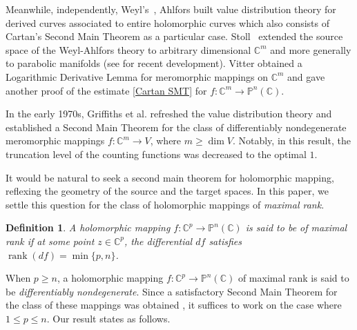 \documentclass[english, 12pt]{amsart}
\DeclareMathOperator{\rank}{rank}
\theoremstyle{plain}
\newtheorem{defi}[thm]{Definition}
\theoremstyle{remark}
\numberwithin{equation}{section}
\theoremstyle{plain}
\theoremstyle{named}
\begin{document}
	
	Meanwhile, independently, Weyl's~\cite{Weyl1938,Weyl1943}, Ahlfors \cite{Ahlfors1941} built value distribution theory for derived curves associated to entire holomorphic curves which also consists of Cartan's Second Main Theorem as a particular case. Stoll~\cite{Stoll53,Stoll54} extended the source space of the Weyl-Ahlfors theory to arbitrary dimensional $\mathbb{C}^m$ and more generally to parabolic manifolds (see \cite{HX2022} for recent development). Vitter \cite{Vitter77} obtained a Logarithmic Derivative Lemma for meromorphic mappings on $\mathbb{C}^m$ and  gave another proof of the estimate \eqref{Cartan SMT} for $f\colon\mathbb{C}^m\rightarrow\mathbb{P}^n(\mathbb{C})$.
	
In the early 1970s, Griffiths et al. \cite{Carlson-Griffiths 72, Griffiths-King73} refreshed the value distribution theory and established a  Second Main Theorem for the class of differentiably nondegenerate meromorphic mappings $f\colon \mathbb{C}^m\rightarrow V$, where $m\geq\dim V$. Notably, in this result, the truncation level of the counting functions  was decreased to the optimal $1$.
	
It  would be natural to seek a second main theorem for holomorphic mapping, reflexing the geometry of the source and the target spaces. In this paper, we settle this question for the class of holomorphic mappings of {\sl maximal rank}.
\begin{defi}
A holomorphic mapping $f\colon\mathbb{C}^p\rightarrow\mathbb{P}^n(\mathbb{C})$ is said to be of {\sl maximal rank} if at some point $z\in\mathbb{C}^p$, the differential $df$ satisfies $\rank(df)=\min\{p,n\}$.	
\end{defi}
When $p\geq n$, a holomorphic mapping $f\colon\mathbb{C}^p\rightarrow\mathbb{P}^n(\mathbb{C})$ of maximal rank is said to be {\sl differentiably nondegenerate}. Since a satisfactory Second Main Theorem for the class of these mappings was obtained \cite{Carlson-Griffiths 72}, it suffices to work on the case where $1\leq p\leq n$. Our result states as follows.
	
\end{document}
